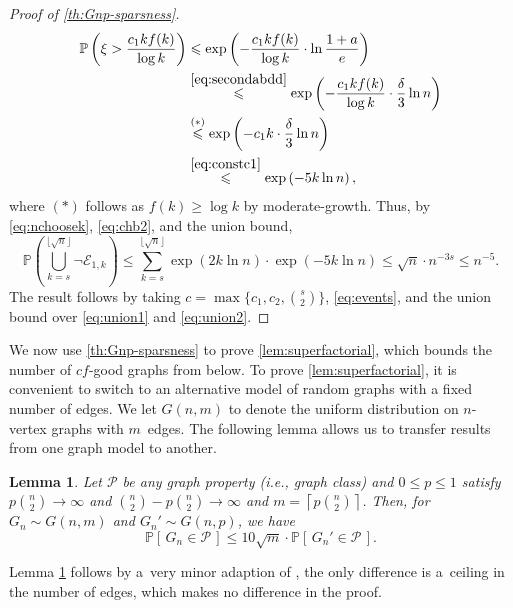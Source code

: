 \documentclass[letterpaper,11pt]{article}
\newcommand{\Slin}{moderate-growth\xspace}
\newtheorem{lemma}[theorem]{Lemma}
\theoremstyle{definition}
\theoremstyle{remark}
\renewcommand{\leq}{\leqslant}
\renewcommand{\geq}{\geqslant}
\renewcommand{\Pr}[1]{\mathbb{P}\left[\,#1\,\right]}
\begin{document}
\begin{proof}[Proof of \cref{th:Gnp-sparsness}]
\begin{align}\label{eq:chb2}
	\mathbb{P}\left(\xi>\frac{c_1 kf(k)}{\log k}\right)&\leq  \exp\left(-\frac{c_1 kf(k)}{\log k}\cdot\ln \frac{1+a}{e}  \right)\notag\\
	&\stackrel{\eqref{eq:secondabdd}}{\leq}   \exp\left(-\frac{c_1 kf(k)}{\log k}\cdot\frac{\delta }{3}\ln n  \right)\notag\\
		&\stackrel{(*)}{\leq}  \exp\left(- c_1 k \cdot\frac{\delta }{3}\ln n  \right)\notag\\
		&\stackrel{\eqref{eq:constc1}}{\leq}  \exp\left(-5 k  \ln n  \right)
	,\end{align}
where $(*)$ follows as $f(k)\geq \log k$ by \Slin. Thus, by \eqref{eq:nchoosek}, \eqref{eq:chb2}, and the union bound, 
 \begin{equation} \label{eq:union2}
 	\mathbb{P}\left(\bigcup_{k = s}^{\lfloor \sqrt{n}\rfloor } \neg \mathcal{E}_{1,k}  \right) \leq \sum_{k = s}^{\lfloor \sqrt{n}\rfloor }   \exp\left(2k\ln n\right)\cdot  \exp\left(-5 k \ln n   \right) \leq \sqrt{n}\cdot n^{-3s} \leq  n^{-5} .
 \end{equation} The result follows by taking $c = \max\{c_1,c_2, \binom{s}{2}\} $, \eqref{eq:events}, and the union bound over \eqref{eq:union1} and \eqref{eq:union2}. 
   \end{proof}
 We now use \cref{th:Gnp-sparsness} to prove \cref{lem:superfactorial}, which bounds the number of $cf$-good graphs from below. To prove \cref{lem:superfactorial}, it is convenient to switch to an alternative model of random graphs with a fixed number of edges. We let $G(n,m)$ to denote the uniform distribution on $n$-vertex graphs with $m$~edges. The following lemma allows us to transfer results from one graph model to another. 

\begin{lemma}\label{lem:transfer}
	Let $\mathcal{P}$ be any graph property (i.e., graph class) and $0\leq p\leq 1$ satisfy $p\binom{n}{2}\rightarrow \infty$ and $\binom{n}{2} -p\binom{n}{2}\rightarrow \infty$ and $m =\left\lceil p\binom{n}{2} \right\rceil $. Then, for $G_n \sim G(n,m)$ and $G_n' \sim G(n,p)$, we have  
	\[ \Pr{G_n\in \mathcal{P}} \leq 10 \sqrt{m}\cdot  \Pr{G_n' \in \mathcal{P}}. \]	
\end{lemma}

Lemma \ref{lem:transfer} follows by a~very minor adaption of \cite[Lemma 3.2]{FriezeKaronski}, the only difference is a~ceiling in the number of edges, which makes no difference in the proof. 
\end{document}
